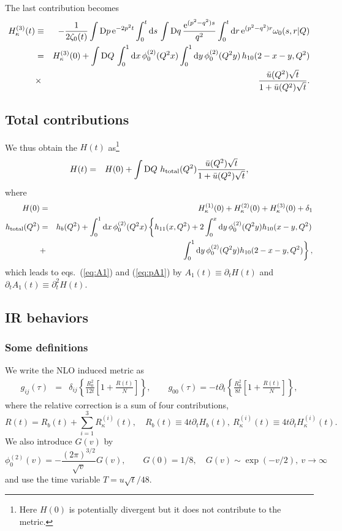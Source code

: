 \documentclass[preprint]{ptephy_v1}%
\newcommand{\rme}{{\rm e}}
\newcommand{\rmd}{{\rm d}}
\newcommand{\rmD}{{\rm D}}
\begin{document}
The last contribution becomes
\begin{eqnarray}
H_{\kappa}^{(3)}(t) &\equiv & -\frac{1}{2\zeta_0(t)} \int \rmD p\, \rme^{-2p^2t} \int_0^t \rmd s\, \int \rmD q\,
\frac{\rme^{(p^2-q^2)s}}{q^2} \int_0^t \rmd r\,  \rme^{(p^2-q^2)r}\omega_0(s,r\vert Q)\nonumber \\
&=&  H_{\kappa}^{(3)}(0) + \int \rmD Q\, \int_0^1  \rmd x\, \phi_0^{(2)}(Q^2x)  \int_0^1  \rmd y\, \phi_0^{(2)}(Q^2y) \, h_{10}(2-x-y,Q^2)
\nonumber \\
&\times & \frac{\bar u(Q^2)\sqrt{t}}{1+ \bar u(Q^2)\sqrt{t}}.
\end{eqnarray}

\subsection{Total contributions}
We thus obtain the $H(t)$ as\footnote{Here $H(0)$ is potentially divergent but it does not contribute to the metric.}
\begin{eqnarray}
H(t) &=& H(0) +\int \rmD Q\  h_{\rm total}(Q^2) \frac{\bar u(Q^2)\sqrt{t}}{1+ \bar u(Q^2)\sqrt{t}},
\end{eqnarray}
where
\begin{eqnarray}
H(0) &=& H_\kappa^{(1)}(0) +H_\kappa^{(2)}(0) + H_\kappa^{(3)}(0)+\delta_1 \\
h_{\rm total}(Q^2) &=& h_b(Q^2) + \int_0^1 \rmd x\, \phi_0^{(2)}(Q^2x) \left\{h_{11}(x,Q^2)
+2\int_0^x \rmd y\, \phi_0^{(2)}(Q^2y) h_{10}(x-y,Q^2) \right. \nonumber \\
&+&\left.
\int_0^1  \rmd y\, \phi_0^{(2)}(Q^2y)h_{10}(2-x-y,Q^2) \right\} ,
\end{eqnarray}
which leads to eqs.~(\ref{eq:A1}) and (\ref{eq:pA1}) by $A_1(t) \equiv \partial_t H(t)$ and $ \partial_t A_1(t) \equiv \partial^2_t  H(t)$.


\subsection{IR behaviors}
\subsubsection{Some definitions}
We write the NLO induced metric as
\begin{eqnarray}
g_{ij}(\tau) &=&\delta_{ij} \left\{ \frac{R_0^2}{12 t} \left[ 1+\frac{R(t)}{N} \right]\right\}, \qquad
g_{00}(\tau) = -t \partial_t \left\{ \frac{R_0^2}{8 t} \left[ 1+\frac{R(t)}{N} \right]\right\},
\end{eqnarray}
where the relative correction is a sum of four contributions,
\begin{equation}
R(t)=R_b(t)+\sum_{i=1}^3R^{(i)}_\kappa(t),\quad  R_b(t) \equiv 4t\partial_t H_b(t), \ R_\kappa^{(i)}(t) \equiv 4t\partial_t H_\kappa^{(i)}(t).
\end{equation}
We also introduce $G(v)$ by
\begin{equation}
\phi^{(2)}_{ 0}(v)=-\frac{(2\pi)^{3/2}}{\sqrt{v}}G(v),\qquad G(0)=1/8, \quad G(v)\sim \exp(-v/2),\  v\rightarrow\infty
\end{equation}
and use the time variable $T = u\sqrt{t}/48$.
\end{document}
